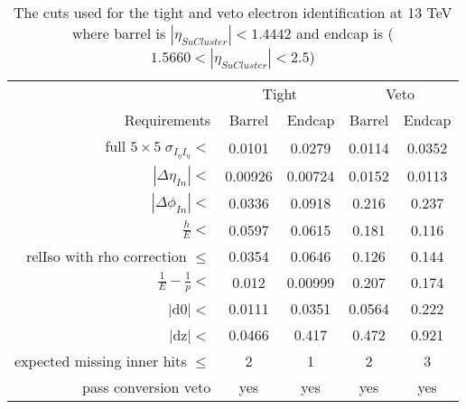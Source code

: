 \begin{table}[htpb!]
\footnotesize
\begin{center}
\begin{tabular}{|r|c|c|c|c|}
\hline
& \multicolumn{2}{c|}{Tight} & \multicolumn{2}{c|}{Veto} \\
\cline{2-5}
Requirements &  Barrel        &   Endcap  &  Barrel        &   Endcap  \\

\hline
full $5\times5 \; \sigma_{I_{\eta}I_{\eta}} < $ & 0.0101 & 0.0279 & 0.0114 & 0.0352\\
$|\Delta \eta_{In}| < $  & 0.00926 & 0.00724  & 0.0152 & 0.0113  \\
$|\Delta \phi_{In}| < $  &  0.0336 & 0.0918 &  0.216 & 0.237  \\
$\frac{h}{E} <$ &0.0597 & 0.0615  &0.181 & 0.116  \\
relIso with rho correction  $\leq$  & 0.0354 & 0.0646& 0.126 & 0.144\\
$\frac{1}{E} - \frac{1}{p} < $ & 0.012 & 0.00999  & 0.207 & 0.174 \\
$|$d$0| < $  & 0.0111 & 0.0351  & 0.0564 & 0.222\\
$|$dz$| < $  & 0.0466 & 0.417 & 0.472 & 0.921\\
expected missing inner hits $\leq$ & 2 & 1 & 2 & 3  \\
pass conversion veto & yes & yes& yes & yes  \\
\hline
\end{tabular}
\caption{The cuts used for the tight and veto electron identification at 13 TeV where barrel is $|\eta_{SuCluster}|< 1.4442$ and endcap is  ($1.5660<|\eta_{SuCluster}|<2.5$)}
\label{tab:electron_tight_cuts13}
\end{center}
\end{table}



